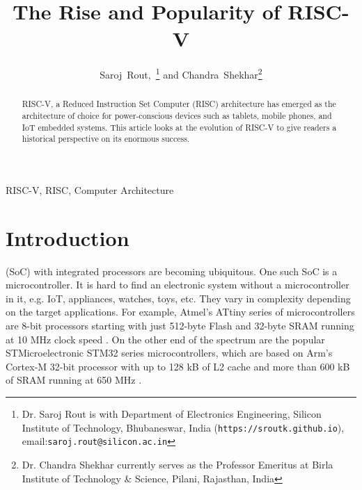 \documentclass[journal]{IEEEtran}
\begin{document}
%
\title{The Rise and Popularity of RISC-V}
%
\author{Saroj~Rout,~\thanks{Dr. Saroj Rout is with Department of Electronics Engineering, Silicon Institute of Technology, Bhubaneswar, India (\texttt{https://sroutk.github.io}), email:\texttt{saroj.rout@silicon.ac.in}} and Chandra~Shekhar\thanks{Dr. Chandra Shekhar currently serves as the Professor Emeritus at Birla Institute of Technology \& Science, Pilani, Rajasthan, India} }


\maketitle

\begin{abstract}

RISC-V, a Reduced Instruction Set Computer (RISC) architecture has emerged as the architecture of choice for power-conscious devices such as tablets, mobile phones, and IoT embedded systems. This article looks at the evolution of RISC-V to give readers a historical perspective on its enormous success.  

\end{abstract}

\begin{IEEEkeywords}
RISC-V, RISC, Computer Architecture
\end{IEEEkeywords}

\section{Introduction}

 (SoC) with integrated processors are becoming ubiquitous. One such SoC is a microcontroller. It is hard to find an electronic system without a microcontroller in it, e.g. IoT, appliances, watches, toys, etc. They vary in complexity depending on the target applications. For example, Atmel's ATtiny series of microcontrollers are 8-bit processors starting with just 512-byte Flash and 32-byte SRAM running at 10 MHz clock speed \cite{microchip_attiny85_nodate}. On the other end of the spectrum are the popular STMicroelectronic STM32 series microcontrollers, which are based on Arm's Cortex-M 32-bit processor with up to 128 kB of L2 cache and more than 600 kB of SRAM running at 650 MHz \cite{stmicroelectronics_stm32_nodate}.
\end{document}
